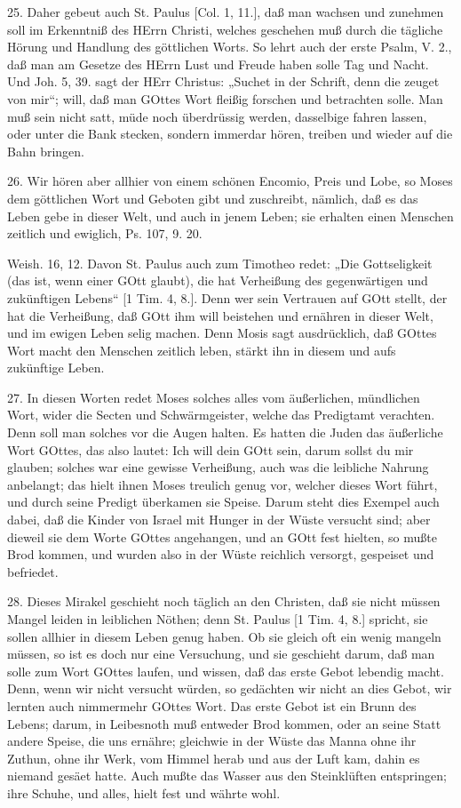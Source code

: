 25. Daher gebeut auch St. Paulus [Col. 1, 11.], daß man wachsen und zunehmen soll im Erkenntniß des HErrn Christi, welches geschehen muß durch die tägliche Hörung und Handlung des göttlichen Worts. So lehrt auch der erste Psalm, V. 2., daß man am Gesetze des HErrn Lust und Freude haben solle Tag und Nacht. Und Joh. 5, 39. sagt der HErr Christus: „Suchet in der Schrift, denn die zeuget von mir“; will, daß man GOttes Wort fleißig forschen und betrachten solle. Man muß sein nicht satt, müde noch überdrüssig werden, dasselbige fahren lassen, oder unter die Bank stecken, sondern immerdar hören, treiben und wieder auf die Bahn bringen.

26. Wir hören aber allhier von einem schönen Encomio, Preis und Lobe, so Moses dem göttlichen Wort und Geboten gibt und zuschreibt, nämlich, daß es das Leben gebe in dieser Welt, und auch in jenem Leben; sie erhalten einen Menschen zeitlich und ewiglich, Ps. 107, 9. 20.

Weish. 16, 12. Davon St. Paulus auch zum Timotheo redet: „Die Gottseligkeit (das ist, wenn einer GOtt glaubt), die hat Verheißung des gegenwärtigen und zukünftigen Lebens“ [1 Tim. 4, 8.]. Denn wer sein Vertrauen auf GOtt stellt, der hat die Verheißung, daß GOtt ihm will beistehen und ernähren in dieser Welt, und im ewigen Leben selig machen. Denn Mosis sagt ausdrücklich, daß GOttes Wort macht den Menschen zeitlich leben, stärkt ihn in diesem und aufs zukünftige Leben.

27. In diesen Worten redet Moses solches alles vom äußerlichen, mündlichen Wort, wider die Secten und Schwärmgeister, welche das Predigtamt verachten. Denn soll man solches vor die Augen halten. Es hatten die Juden das äußerliche Wort GOttes, das also lautet: Ich will dein GOtt sein, darum sollst du mir glauben; solches war eine gewisse Verheißung, auch was die leibliche Nahrung anbelangt; das hielt ihnen Moses treulich genug vor, welcher dieses Wort führt, und durch seine Predigt überkamen sie Speise. Darum steht dies Exempel auch dabei, daß die Kinder von Israel mit Hunger in der Wüste versucht sind; aber dieweil sie dem Worte GOttes angehangen, und an GOtt fest hielten, so mußte Brod kommen, und wurden also in der Wüste reichlich versorgt, gespeiset und befriedet.

28. Dieses Mirakel geschieht noch täglich an den Christen, daß sie nicht müssen Mangel leiden in leiblichen Nöthen; denn St. Paulus [1 Tim. 4, 8.] spricht, sie sollen allhier in diesem Leben genug haben. Ob sie gleich oft ein wenig mangeln müssen, so ist es doch nur eine Versuchung, und sie geschieht darum, daß man solle zum Wort GOttes laufen, und wissen, daß das erste Gebot lebendig macht. Denn, wenn wir nicht versucht würden, so gedächten wir nicht an dies Gebot, wir lernten auch nimmermehr GOttes Wort. Das erste Gebot ist ein Brunn des Lebens; darum, in Leibesnoth muß entweder Brod kommen, oder an seine Statt andere Speise, die uns ernähre; gleichwie in der Wüste das Manna ohne ihr Zuthun, ohne ihr Werk, vom Himmel herab und aus der Luft kam, dahin es niemand gesäet hatte. Auch mußte das Wasser aus den Steinklüften entspringen; ihre Schuhe, und alles, hielt fest und währte wohl.

